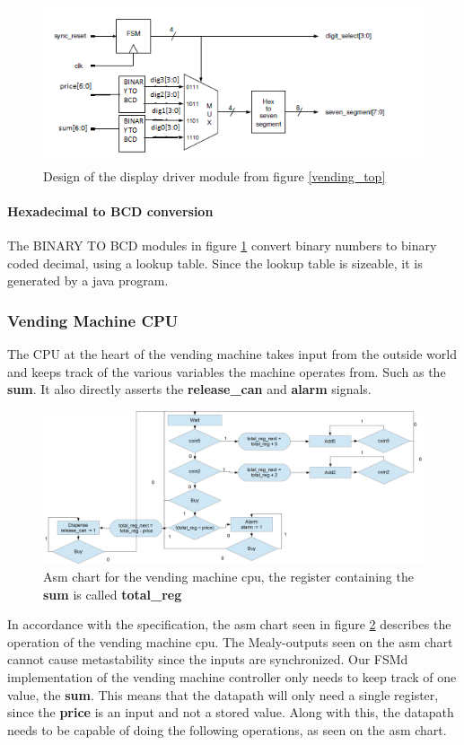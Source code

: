 \begin{figure}
    \center
    \includegraphics{pictures/display_sch.png}
    \caption{Design of the display driver module from figure \ref{vending_top}}
    \label{display_sch}
\end{figure}

\paragraph{Hexadecimal to BCD conversion}
The BINARY TO BCD modules in figure \ref{display_sch} convert binary numbers to binary coded decimal, using a lookup table.
Since the lookup table is sizeable, it is generated by a java program.
\subsubsection{Vending Machine CPU}
The CPU at the heart of the vending machine takes input from the outside world and keeps track of the various variables the machine operates from. 
Such as the \textbf{sum}. It also directly asserts the \textbf{release\_can} and \textbf{alarm} signals. 

\begin{figure}
    \center
    \includegraphics[width=1\textwidth]{pictures/cola_asm.png}
    \caption{Asm chart for the vending machine cpu, the register containing the \textbf{sum} is called \textbf{total\_reg}}
    \label{cola_asm}
\end{figure}
In accordance with the specification, the asm chart seen in figure \ref{cola_asm}
describes the operation of the vending machine cpu. The Mealy-outputs seen on the asm chart cannot cause metastability since the inputs are synchronized.
Our FSMd implementation of the vending machine controller only needs to keep track of one value, the \textbf{sum}.
This means that the datapath will only need a single register, since the \textbf{price} is an input and not a stored value.
Along with this, the datapath needs to be capable of doing the following operations, as seen on the asm chart. \\


